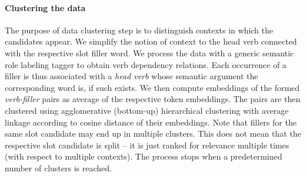 \paragraph{Clustering the data}
The purpose of data clustering step is to distinguish contexts in which the candidates appear.
We simplify the notion of context to the head verb connected with the respective slot filler word.
We process the data with a generic semantic role labeling tagger to obtain verb dependency relations.
Each occurrence of a filler is thus associated with a \emph{head verb} whose semantic argument the corresponding word is, if such exists. 
We then compute embeddings of the formed \emph{verb-filler} pairs as average of the respective token embeddings.
The pairs are then clustered using agglomerative (bottom-up) hierarchical clustering with average linkage according to cosine distance of their embeddings.
Note that fillers for the same slot candidate may end up in multiple clusters.
This does not mean that the respective slot candidate is split -- it is just ranked for relevance multiple times (with respect to multiple contexts).
The process stops when a predetermined number of clusters is reached.

